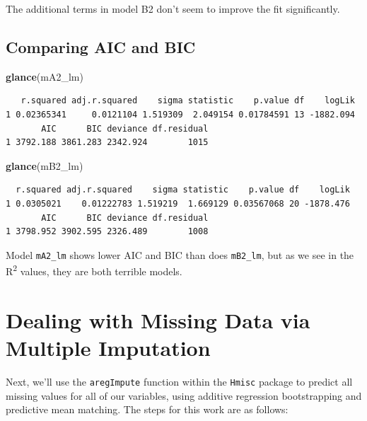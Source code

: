 \documentclass[]{book}
\newenvironment{Shaded}{\begin{snugshade}}{\end{snugshade}}
\newcommand{\KeywordTok}[1]{\textcolor[rgb]{0.13,0.29,0.53}{\textbf{#1}}}
\newcommand{\NormalTok}[1]{#1}
\theoremstyle{definition}
\theoremstyle{definition}
\theoremstyle{definition}
\theoremstyle{remark}
\begin{document}
The additional terms in model B2 don't seem to improve the fit
significantly.

\subsection{Comparing AIC and BIC}\label{comparing-aic-and-bic-1}

\begin{Shaded}
\begin{Highlighting}[]
\KeywordTok{glance}\NormalTok{(mA2_lm)}
\end{Highlighting}
\end{Shaded}

\begin{verbatim}
   r.squared adj.r.squared    sigma statistic    p.value df    logLik
1 0.02365341     0.0121104 1.519309  2.049154 0.01784591 13 -1882.094
       AIC      BIC deviance df.residual
1 3792.188 3861.283 2342.924        1015
\end{verbatim}

\begin{Shaded}
\begin{Highlighting}[]
\KeywordTok{glance}\NormalTok{(mB2_lm)}
\end{Highlighting}
\end{Shaded}

\begin{verbatim}
  r.squared adj.r.squared    sigma statistic    p.value df    logLik
1 0.0305021    0.01222783 1.519219  1.669129 0.03567068 20 -1878.476
       AIC      BIC deviance df.residual
1 3798.952 3902.595 2326.489        1008
\end{verbatim}

Model \texttt{mA2\_lm} shows lower AIC and BIC than does
\texttt{mB2\_lm}, but as we see in the R\textsuperscript{2} values, they
are both terrible models.

\section{Dealing with Missing Data via Multiple
Imputation}\label{dealing-with-missing-data-via-multiple-imputation-1}

Next, we'll use the \texttt{aregImpute} function within the
\texttt{Hmisc} package to predict all missing values for all of our
variables, using additive regression bootstrapping and predictive mean
matching. The steps for this work are as follows:
\end{document}
